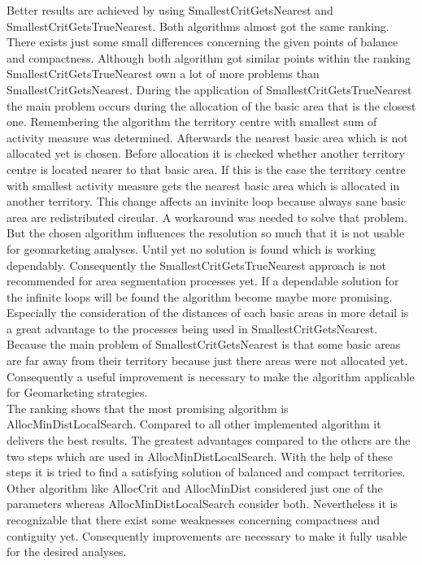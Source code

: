 Better results are achieved by using SmallestCritGetsNearest and SmallestCritGetsTrueNearest. Both algorithms almost got the same ranking. There exists just some small differences concerning the given points of balance and compactness. Although both algorithm got similar points within the ranking SmallestCritGetsTrueNearest own a lot of more problems than SmallestCritGetsNearest. During the application of SmallestCritGetsTrueNearest the main problem occurs during the allocation of the basic area that is the closest one. Remembering the algorithm the territory centre with smallest sum of activity measure was determined. Afterwards the nearest basic area which is not allocated yet is chosen. Before allocation it is checked whether another territory centre is located nearer to that basic area. If this is the case the territory centre with smallest activity measure gets the nearest basic area which is allocated in another territory. This change affects an invinite loop because always sane basic area are redistributed circular. A workaround was needed to solve that problem. But the chosen algorithm influences the resolution so much that it is not usable for geomarketing analyses. Until yet no solution is found which is working dependably. Consequently the SmallestCritGetsTrueNearest approach is not recommended for area segmentation processes yet. If a dependable solution for the infinite loops will be found the algorithm become maybe more promising. Especially the consideration of the distances of each basic areas in more detail is a great advantage to the processes being used in SmallestCritGetsNearest. Because the main problem of SmallestCritGetsNearest is that some basic areas are far away from their territory because just there areas were not allocated yet. Consequently a useful improvement is necessary to make the algorithm applicable for Geomarketing strategies. \\The ranking shows that the most promising algorithm is AllocMinDistLocalSearch. Compared to all other implemented algorithm it delivers the best results. The greatest advantages compared to the others are the two steps which are used in AllocMinDistLocalSearch. With the help of these steps it is tried to find a satisfying solution of balanced and compact territories. Other algorithm like AllocCrit and AllocMinDist considered just one of the parameters whereas AllocMinDistLocalSearch consider both. Nevertheless it is recognizable that there exist some weaknesses concerning compactness and contiguity yet. Consequently improvements are necessary to make it fully usable for the desired analyses. 

